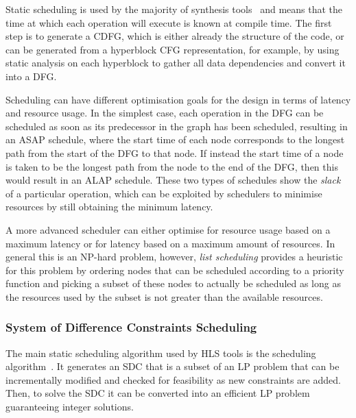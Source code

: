 Static scheduling is used by the majority of synthesis
tools~\cite{canis13_legup, xilinx20_vivad_high_synth, amd23_vitis_high_synth,
  mentor20_catap_high_level_synth, intel20_sdk_openc_applic,
  roane23_autom_hw_sw_co_desig} and means that the time at which each operation
will execute is known at compile time.  The first step is to generate a
\gls{CDFG}, which is either already the structure of the code, or can be
generated from a \gls{hyperblock} \gls{CFG} representation, for example, by
using static analysis on each \gls{hyperblock} to gather all data dependencies
and convert it into a \gls{DFG}.

Scheduling can have different optimisation goals for the design in terms of
latency and resource usage.  In the simplest case, each operation in the
\gls{DFG} can be scheduled as soon as its predecessor in the graph has been
scheduled, resulting in an \gls{ASAP} schedule, where the start time of each
node corresponds to the longest path from the start of the \gls{DFG} to that
node.  If instead the start time of a node is taken to be the longest path from
the node to the end of the \gls{DFG}, then this would result in an \gls{ALAP}
schedule.  These two types of schedules show the \emph{slack} of a particular
operation, which can be exploited by schedulers to minimise resources by still
obtaining the minimum latency.

A more advanced scheduler can either optimise for resource usage based on a
maximum latency or for latency based on a maximum amount of resources.  In
general this is an NP-hard problem, however, \emph{\gls{list scheduling}}
provides a heuristic for this problem by ordering nodes that can be scheduled
according to a priority function and picking a subset of these nodes to actually
be scheduled as long as the resources used by the subset is not greater than the
available resources.

\subsubsection{System of Difference Constraints Scheduling}

The main static scheduling algorithm used by \gls{HLS} tools is the
 scheduling algorithm~\cite{cong06_sdc}.  It
generates an \gls{SDC} that is a subset of an \gls{LP} problem that can be
incrementally modified and checked for feasibility as new constraints are added.
Then, to solve the \gls{SDC} it can be converted into an efficient \gls{LP}
problem guaranteeing integer solutions.


